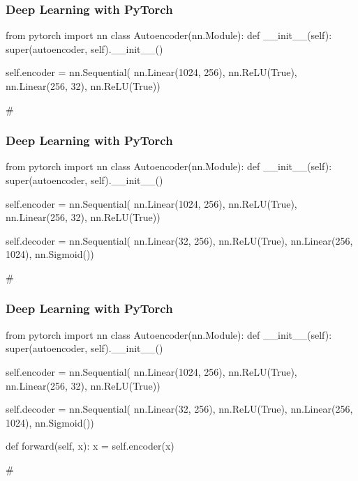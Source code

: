 \documentclass{beamer}
\begin{document}
\begin{frame}[fragile]\frametitle{Deep Learning with PyTorch} 
    \begin{pythoncode}
        from pytorch import nn
        class Autoencoder(nn.Module):
            def __init__(self):
                super(autoencoder, self).__init__()

                self.encoder = nn.Sequential(
                    nn.Linear(1024, 256),
                    nn.ReLU(True),
                    nn.Linear(256, 32),
                    nn.ReLU(True))











        #
    \end{pythoncode}
    \vfill
\end{frame}

\begin{frame}[fragile]\frametitle{Deep Learning with PyTorch} 
    \begin{pythoncode}
        from pytorch import nn
        class Autoencoder(nn.Module):
            def __init__(self):
                super(autoencoder, self).__init__()

                self.encoder = nn.Sequential(
                    nn.Linear(1024, 256),
                    nn.ReLU(True),
                    nn.Linear(256, 32),
                    nn.ReLU(True))

                self.decoder = nn.Sequential(
                    nn.Linear(32, 256),
                    nn.ReLU(True),
                    nn.Linear(256, 1024),
                    nn.Sigmoid())





        #
    \end{pythoncode}
    \vfill
\end{frame}

\begin{frame}[fragile]\frametitle{Deep Learning with PyTorch} 
    \begin{pythoncode}
        from pytorch import nn
        class Autoencoder(nn.Module):
            def __init__(self):
                super(autoencoder, self).__init__()

                self.encoder = nn.Sequential(
                    nn.Linear(1024, 256),
                    nn.ReLU(True),
                    nn.Linear(256, 32),
                    nn.ReLU(True))

                self.decoder = nn.Sequential(
                    nn.Linear(32, 256),
                    nn.ReLU(True),
                    nn.Linear(256, 1024),
                    nn.Sigmoid())

            def forward(self, x):
                x = self.encoder(x)


        #
    \end{pythoncode}
    \vfill
\end{frame}
\end{document}
